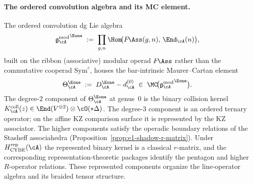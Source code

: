 \paragraph{The ordered convolution algebra and its MC element.}
The ordered convolution dg Lie algebra
\begin{equation}\label{eq:intro-gAmod-e1}
{\gAmod}^{\Eone}
\;:=\;
\prod_{g,n}
\Hom\!\bigl(F\!\Ass(g,n),\,\End_\cA(n)\bigr),
\end{equation}
built on the ribbon (associative) modular operad
$F\!\Ass$ rather than the commutative cooperad
$\mathrm{Sym}^c$, houses the bar-intrinsic Maurer--Cartan element
\begin{equation}\label{eq:intro-theta-e1}
\Theta_\cA^{\Eone}
\;:=\;
D_\cA^{\Eone} - d_\cA^{(0)}
\;\in\;
\MC\!\bigl({\gAmod}^{\Eone}\bigr).
\end{equation}
The degree-$2$ component of $\Theta_\cA^{\Eone}$ at
genus~$0$ is the binary collision kernel
$K_\cA^{\mathrm{coll}}(z)\in
\End(V^{\otimes 2})\otimes\cO(*\Delta)$.  The degree-$3$ component is
an ordered ternary operator; on the affine KZ comparison surface it
is represented by the KZ associator.  The higher components satisfy
the operadic boundary relations of the Stasheff associahedra
(Proposition~\ref{prop:e1-shadow-r-matrix}).  Under
$H_{\mathrm{CYBE}}^{\mathrm{rep}}(\cA)$ the represented binary
kernel is a classical $r$-matrix, and the corresponding
representation-theoretic packages identify the pentagon and higher
$R$-operator relations.  These represented components organize the
line-operator algebra and its braided tensor structure.

